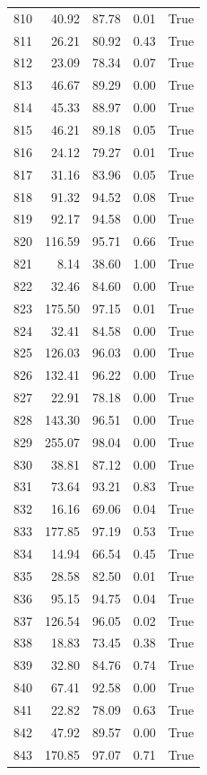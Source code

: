 \begin{longtable}{rrrrr}
810 & 40.92 & 87.78 & 0.01 & True \\
811 & 26.21 & 80.92 & 0.43 & True \\
812 & 23.09 & 78.34 & 0.07 & True \\
813 & 46.67 & 89.29 & 0.00 & True \\
814 & 45.33 & 88.97 & 0.00 & True \\
815 & 46.21 & 89.18 & 0.05 & True \\
816 & 24.12 & 79.27 & 0.01 & True \\
817 & 31.16 & 83.96 & 0.05 & True \\
818 & 91.32 & 94.52 & 0.08 & True \\
819 & 92.17 & 94.58 & 0.00 & True \\
820 & 116.59 & 95.71 & 0.66 & True \\
821 & 8.14 & 38.60 & 1.00 & True \\
822 & 32.46 & 84.60 & 0.00 & True \\
823 & 175.50 & 97.15 & 0.01 & True \\
824 & 32.41 & 84.58 & 0.00 & True \\
825 & 126.03 & 96.03 & 0.00 & True \\
826 & 132.41 & 96.22 & 0.00 & True \\
827 & 22.91 & 78.18 & 0.00 & True \\
828 & 143.30 & 96.51 & 0.00 & True \\
829 & 255.07 & 98.04 & 0.00 & True \\
830 & 38.81 & 87.12 & 0.00 & True \\
831 & 73.64 & 93.21 & 0.83 & True \\
832 & 16.16 & 69.06 & 0.04 & True \\
833 & 177.85 & 97.19 & 0.53 & True \\
834 & 14.94 & 66.54 & 0.45 & True \\
835 & 28.58 & 82.50 & 0.01 & True \\
836 & 95.15 & 94.75 & 0.04 & True \\
837 & 126.54 & 96.05 & 0.02 & True \\
838 & 18.83 & 73.45 & 0.38 & True \\
839 & 32.80 & 84.76 & 0.74 & True \\
840 & 67.41 & 92.58 & 0.00 & True \\
841 & 22.82 & 78.09 & 0.63 & True \\
842 & 47.92 & 89.57 & 0.00 & True \\
843 & 170.85 & 97.07 & 0.71 & True \\

\end{longtable}
